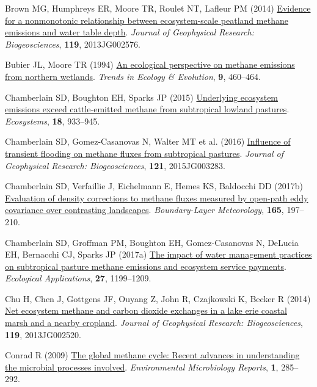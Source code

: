 \documentclass[
  12pt,
]{article}
\newlength{\cslhangindent}
\newenvironment{CSLReferences}[2] %
 {\begin{list}{}{%
  \setlength{\itemindent}{0pt}
  \setlength{\leftmargin}{0pt}
  \setlength{\parsep}{0pt}
  \ifodd #1
   \setlength{\leftmargin}{\cslhangindent}
   \setlength{\itemindent}{-1\cslhangindent}
  \fi
  \setlength{\itemsep}{#2\baselineskip}}}
 {\end{list}}
\begin{document}
\begin{CSLReferences}{1}{0}
Brown MG, Humphreys ER, Moore TR, Roulet NT, Lafleur PM (2014)
\href{https://doi.org/10.1002/2013JG002576}{Evidence for a nonmonotonic
relationship between ecosystem-scale peatland methane emissions and
water table depth}. \emph{Journal of Geophysical Research:
Biogeosciences}, \textbf{119}, 2013JG002576.

Bubier JL, Moore TR (1994)
\href{https://doi.org/10.1016/0169-5347(94)90309-3}{An ecological
perspective on methane emissions from northern wetlands}. \emph{Trends
in Ecology \& Evolution}, \textbf{9}, 460--464.

Chamberlain SD, Boughton EH, Sparks JP (2015)
\href{https://doi.org/10.1007/s10021-015-9873-x}{Underlying ecosystem
emissions exceed cattle-emitted methane from subtropical lowland
pastures}. \emph{Ecosystems}, \textbf{18}, 933--945.

Chamberlain SD, Gomez-Casanovas N, Walter MT et al. (2016)
\href{https://doi.org/10.1002/2015JG003283}{Influence of transient
flooding on methane fluxes from subtropical pastures}. \emph{Journal of
Geophysical Research: Biogeosciences}, \textbf{121}, 2015JG003283.

Chamberlain SD, Verfaillie J, Eichelmann E, Hemes KS, Baldocchi DD
(2017b) \href{https://doi.org/10.1007/s10546-017-0275-9}{Evaluation of
density corrections to methane fluxes measured by open-path eddy
covariance over contrasting landscapes}. \emph{Boundary-Layer
Meteorology}, \textbf{165}, 197--210.

Chamberlain SD, Groffman PM, Boughton EH, Gomez-Casanovas N, DeLucia EH,
Bernacchi CJ, Sparks JP (2017a)
\href{https://doi.org/10.1002/eap.1514}{The impact of water management
practices on subtropical pasture methane emissions and ecosystem service
payments}. \emph{Ecological Applications}, \textbf{27}, 1199--1209.

Chu H, Chen J, Gottgens JF, Ouyang Z, John R, Czajkowski K, Becker R
(2014) \href{https://doi.org/10.1002/2013JG002520}{Net ecosystem methane
and carbon dioxide exchanges in a lake erie coastal marsh and a nearby
cropland}. \emph{Journal of Geophysical Research: Biogeosciences},
\textbf{119}, 2013JG002520.

Conrad R (2009)
\href{https://doi.org/10.1111/j.1758-2229.2009.00038.x}{The global
methane cycle: Recent advances in understanding the microbial processes
involved}. \emph{Environmental Microbiology Reports}, \textbf{1},
285--292.


\end{CSLReferences}
\end{document}
